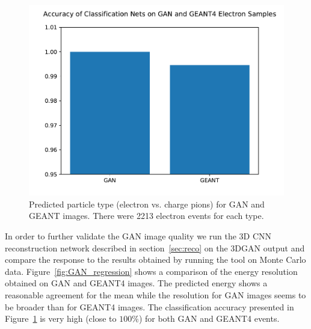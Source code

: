 \begin{figure}
    \centering
    \includegraphics[scale=0.4, trim={0.5cm 0.1cm 0 1.1cm}, clip]{Images/Calo/GAN_GEANT_class_accuracy_comparison.pdf}
    \caption{Predicted particle type (electron vs. charge pions) for GAN and GEANT images. There were 2213 electron events for each
      type.\label{fig:GAN_classification}}
\end{figure}

In order to further validate the GAN image quality we run the 3D CNN reconstruction network described in section~\ref{sec:reco} on the 3DGAN output and compare the response to the results obtained by running the tool on Monte Carlo data. Figure~\ref{fig:GAN_regression} shows a comparison of the energy resolution obtained on GAN and GEANT4 images. The predicted energy shows a reasonable agreement for the mean while the resolution for GAN images seems to be broader than for GEANT4 images. The classification accuracy presented in Figure~\ref{fig:GAN_classification} is very high (close to $100\%$) for both GAN and GEANT4 events.